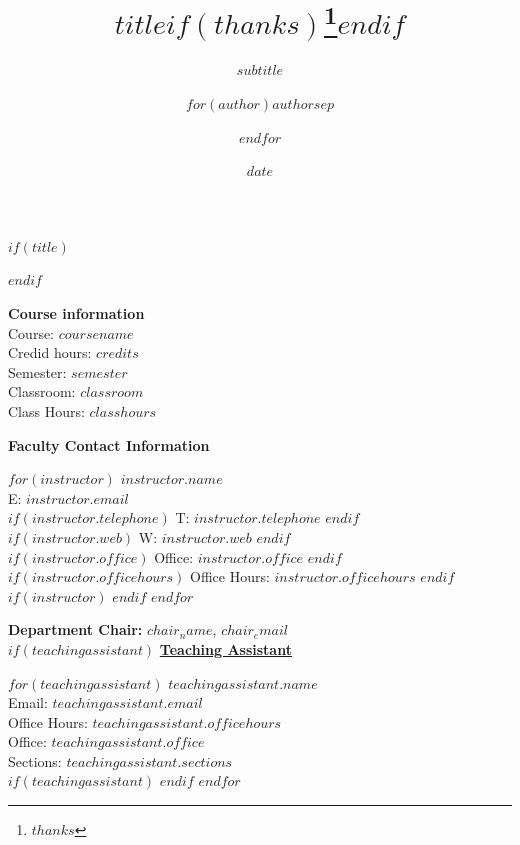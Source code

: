 \documentclass[$if(fontsize)$$fontsize$,$endif$$if(lang)$$babel-lang$,$endif$$if(papersize)$$papersize$,$endif$$for(classoption)$$classoption$$sep$,$endfor$]{article}
\title{\textcolor{unhtext}{$title$}$if(thanks)$\thanks{$thanks$}$endif$}
\subtitle{\textcolor{unhtext}{$subtitle$}}
\date{\textcolor{unhtext}{$date$}}
\date{}
\author{$for(author)$\textcolor{unhtext}{$author$}$sep$ \and $endfor$}
\begin{document}
  

	$if(title)$
	\maketitle
	$endif$
	
	
		\thispagestyle{firststyle}



\noindent\Large{\textbf{Course information}}\vspace{3pt}\\
  Course: $coursename$\\
  Credid hours: $credits$\\
  Semester: $semester$\\
  Classroom: $classroom$\\
  Class Hours: $classhours$

\vspace{10pt}
\noindent\textbf{\Large{Faculty Contact Information}}
\vspace{-8pt}
\begin{multicols}{2}
$for(instructor)$
  \noindent $instructor.name$\\
  E: $instructor.email$\\
  $if(instructor.telephone)$
  T: $instructor.telephone$
  $endif$\\
  $if(instructor.web)$ 
  W: \href{http://$instructor.web$}{\tt $instructor.web$}
  $endif$\\
  $if(instructor.office)$
  Office: $instructor.office$
  $endif$\\
  $if(instructor.officehours)$
  Office Hours: $instructor.officehours$
  $endif$\\
  $if(instructor)$
  \columnbreak
  $endif$
  $endfor$
\end{multicols}
 
 \vspace{-24pt} 	
\noindent\textbf{\Large{Department Chair:}} \textbf{$chair_name$}, $chair_email$\\

$if(teachingassistant)$
\noindent\textbf{\underline{Teaching Assistant}}
  \begin{multicols}{2}
$for(teachingassistant)$
  \noindent\textbf{$teachingassistant.name$}\\
  Email: $teachingassistant.email$\\
  Office Hours: $teachingassistant.officehours$\\
  Office: $teachingassistant.office$\\
  Sections: $teachingassistant.sections$\\
  $if(teachingassistant)$
  \columnbreak
  $endif$
$endfor$
\end{multicols}
\end{document}
